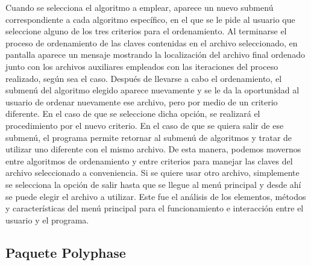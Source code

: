 \documentclass[11pt]{article}
\begin{document}
\par
Cuando se selecciona el algoritmo a emplear, aparece un nuevo submenú correspondiente a cada algoritmo específico, en el que se le pide al usuario que seleccione alguno de los tres criterios para el ordenamiento. Al terminarse el proceso de ordenamiento de las claves contenidas en el archivo seleccionado, en pantalla aparece un mensaje mostrando la localización del archivo final ordenado junto con los archivos auxiliares empleados con las iteraciones del proceso realizado, según sea el caso. Después de llevarse a cabo el ordenamiento, el submenú del algoritmo elegido aparece nuevamente y se le da la oportunidad al usuario de ordenar nuevamente ese archivo, pero por medio de un criterio diferente. En el caso de que se seleccione dicha opción, se realizará el procedimiento por el nuevo criterio. En el caso de que se quiera salir de ese submenú, el programa permite retornar al submenú de algoritmos y tratar de utilizar uno diferente con el mismo archivo. De esta manera, podemos movernos entre algoritmos de ordenamiento y entre criterios para manejar las claves del archivo seleccionado a conveniencia. Si se quiere usar otro archivo, simplemente se selecciona la opción de salir hasta que se llegue al menú principal y desde ahí se puede elegir el archivo a utilizar. Este fue el análisis de los elementos, métodos y características del menú principal para el funcionamiento e interacción entre el usuario y el programa.

\subsection{Paquete Polyphase}
\end{document}
